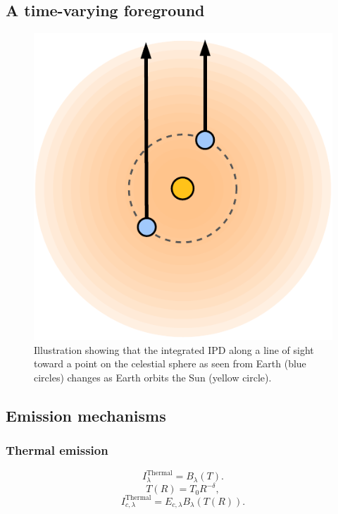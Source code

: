 \documentclass{aa}
\begin{document}
\subsection{A time-varying foreground}
\begin{figure}
    \centering
      \includegraphics[width=0.7\linewidth]{figs/illustration.pdf}
      \caption{Illustration showing that the integrated IPD along a line of sight toward a point on the celestial sphere as seen from Earth (blue circles) changes as Earth orbits the Sun (yellow circle).}
      \label{fig: illustration}
  \end{figure}

\subsection{Emission mechanisms}
\subsubsection{Thermal emission}

\begin{equation}
    I^\mathrm{Thermal}_{\lambda} = B_\lambda(T).
\end{equation}
\begin{equation}
    T(R) = T_0 R^{-\delta},
\end{equation}
\begin{equation}
    I^\mathrm{Thermal}_{c,\lambda} = E_{c,\lambda} B_\lambda(T(R)).
\end{equation}
\end{document}
